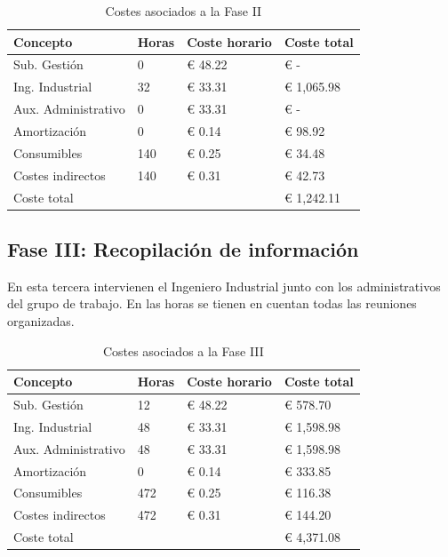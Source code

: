 \begin{table}[H]
    \centering
    \begin{tabular}{llll}
        \toprule
        Concepto            & Horas & Coste horario & Coste total \\
        \midrule
        Sub. Gestión        & 0     & € 48.22       & € -         \\
        Ing. Industrial     & 32    & € 33.31       & € 1,065.98  \\
        Aux. Administrativo & 0     & € 33.31       & € -         \\
        Amortización        & 0     & € 0.14        & € 98.92     \\
        Consumibles         & 140   & € 0.25        & € 34.48     \\
        Costes indirectos   & 140   & € 0.31        & € 42.73     \\
        \midrule
        Coste total         &       &               & € 1,242.11  \\
        \bottomrule
    \end{tabular}
    \caption{Costes asociados a la Fase II}
    \label{tab:fase-formacion}
\end{table}

\subsection{Fase III: Recopilación de información}

En esta tercera intervienen el Ingeniero Industrial junto con los administrativos del grupo de trabajo. En las horas se tienen en cuentan todas las reuniones organizadas.

\begin{table}[H]
    \centering
    \begin{tabular}{llll}
        \toprule
        Concepto            & Horas & Coste horario & Coste total \\
        \midrule
        Sub. Gestión        & 12    & € 48.22       & € 578.70    \\
        Ing. Industrial     & 48    & € 33.31       & € 1,598.98  \\
        Aux. Administrativo & 48    & € 33.31       & € 1,598.98  \\
        Amortización        & 0     & € 0.14        & € 333.85    \\
        Consumibles         & 472   & € 0.25        & € 116.38    \\
        Costes indirectos   & 472   & € 0.31        & € 144.20    \\
        \midrule
        Coste total         &       &               & € 4,371.08  \\
        \bottomrule
    \end{tabular}
    \caption{Costes asociados a la Fase III}
    \label{tab:fase-recopilacion}
\end{table}

